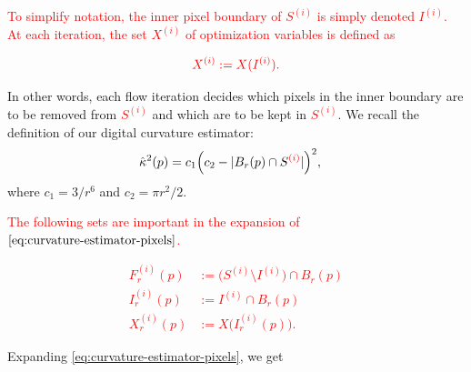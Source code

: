 \documentclass[smallextended]{svjour3}       %
\newcommand{\revision}[1]{\textcolor{red}{#1}}
\begin{document}
\revision{To simplify notation, the inner pixel boundary of $S^{(i)}$ is simply denoted $I^{(i)}$. At each iteration, the set $X^{(i)}$ of optimization variables is defined as}

\begin{align*}
\revision{
	X^{(i)} := X(I^{(i)}).
}
\end{align*}


In other words, each flow iteration decides which pixels in the inner boundary are to be removed from \revision{$S^{(i)}$} and which are to be kept in \revision{$S^{(i)}$}. We recall the definition of our digital curvature estimator:
\begin{align}
	\hat{\kappa}^2(p) &= c_1\Big( c_2 - | B_r(p) \cap S^{\revision{(i)}} | \Big)^2, 
	\label{eq:curvature-estimator-pixels}
\end{align}
where $c_1=3/r^6$ and $c_2=\pi r^2/2$. 

\revision{The following sets are important in the expansion of $\eqref{eq:curvature-estimator-pixels}$.}

\revision{
\begin{align*}
	F_r^{(i)}(p) &:= \big( S^{(i)} \setminus I^{(i)} \big) \cap B_r(p)\\
	I_r^{(i)}(p) &:= I^{(i)} \cap B_r(p) \\
	X_r^{(i)}(p) &:= X\big( I_r^{(i)}(p) \big).
\end{align*}
}

Expanding \eqref{eq:curvature-estimator-pixels}, we get 
\end{document}
